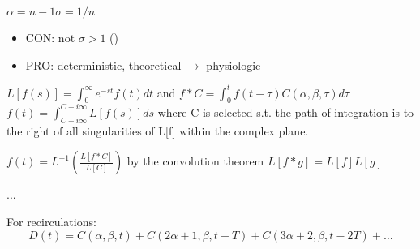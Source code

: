 \begin{frame}
\begin{columns}
\begin{column}{0.5\textwidth}
{\begin{block}{\textwidth}
        \(
        \alpha = n - 1
    
        \sigma = 1 / n
        \)
        \begin{itemize}
            \item CON: not $\sigma > 1$ (\cite{thompsonIndicatorTransitTime1964})
        \end{itemize}
    \end{block}

    \begin{itemize}
        \item PRO: deterministic, theoretical $\rightarrow$ physiologic
    \end{itemize}
    {\tiny
    \(
    L[f(s)] = \int_0^\infty e^{-st} f(t) dt
    \)
    and
    \(
    f*C = \int_0^t f(t-\tau) C(\alpha, \beta, \tau) d\tau
    \)
    \(
    f(t) = \int_{C-i\infty}^{C+i\infty} L[f(s)] ds
    \)
    where C is selected s.t. the path of integration is to the right of all singularities of L[f] within the complex plane.

    \(
    f(t) = L^{-1}\left(\frac{L[f*C]}{L[C]}\right)
    \)
    by the convolution theorem
    \(
    L[f*g] = L[f]L[g]
    \)
    }
    
    ...
    
    For recirculations:
    \begin{equation}
    D(t) = C(\alpha, \beta, t) + C(2\alpha+1, \beta, t-T) + C(3\alpha+2, \beta, t-2T) + \dots
    \end{equation}
    
    }
    \end{column}
    \end{columns}   %

\end{frame}



